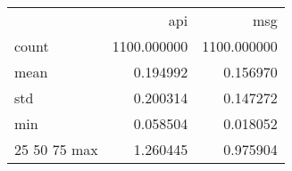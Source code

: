 \begin{tabular}{lrr}
 & api & msg \\
count & 1100.000000 & 1100.000000 \\
mean & 0.194992 & 0.156970 \\
std & 0.200314 & 0.147272 \\
min & 0.058504 & 0.018052 \\
25%
50%
75%
max & 1.260445 & 0.975904 \\
\end{tabular}
